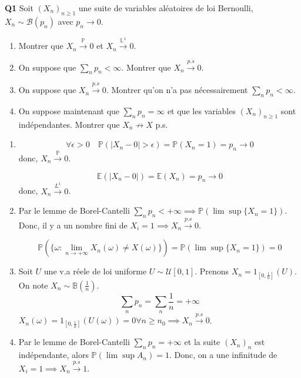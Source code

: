 \documentclass[french]{article}
\begin{document}
\begin{tcolorbox}[colback=gray!5!white,colframe=gray!75!black]
	\textbf{\large{Q1}} Soit $(X_n)_{n \geq 1}$ une suite de variables aléatoires de loi Bernoulli, $X_n \sim \mathcal{B}(p_n)$ avec $p_n \to 0$. 
	\begin{enumerate}
		\item Montrer que $X_n \xrightarrow{\mathbb{P}} 0$ et $X_n \xrightarrow{\mathbb{L}^1} 0$.
		\item On suppose que $\sum_{n} p_n < \infty$. Montrer que $X_n \xrightarrow{p.s} 0$.
		\item On suppose que $X_n \xrightarrow{p.s} 0$. Montrer qu'on n'a pas nécessairement $\sum_{n}p_n < \infty$.
		\item On suppose maintenant que $\sum_{n}p_n = \infty$ et que les variables $(X_n)_{n \geq 1}$ sont indépendantes. Montrer que $X_n \not\to X$ p.s.
	\end{enumerate}
\end{tcolorbox}

\begin{enumerate}
	
\item
\[\forall \epsilon>0 \quad \mathbb{P}(|X_n - 0| > \epsilon) = \mathbb{P}(X_n = 1) = p_n \to 0\]
donc, $X_n \xrightarrow{\mathbb{P}} 0$.

\[\mathbb{E}(|X_n - 0|) = \mathbb{E}(X_n) = p_n \to 0\]
donc, $X_n \xrightarrow{L^1} 0$.

\item
Par le lemme de Borel-Cantelli $\sum_n p_n < +\infty \implies \mathbb{P}(\lim \sup \{X_n = 1\})$. Donc, il y a un nombre fini de $X_i = 1 \implies X_n \xrightarrow{p.s} 0$.

\[\mathbb{P}\left(\{\omega : \lim_{n \to +\infty} X_n(\omega) \neq X(\omega)\}\right) = \mathbb{P}(\lim \sup \{X_n = 1\}) = 0\]

\item
Soit $U$ une v.a réele de loi uniforme $U \sim \mathcal{U}[0,1]$.
Prenons $X_n = \mathfrak{1}_{[0, \frac{1}{n}]}(U)$. On note $X_n \sim \mathbb{B}(\frac{1}{n})$.
\[\sum_{n} p_n = \sum_n \frac{1}{n} = +\infty\]
$X_n(\omega) = \mathfrak{1}_{[0, \frac{1}{n}]}(U(\omega)) = 0 \forall n \geq n_0 \implies X_n \xrightarrow{p.s} 0$.

\item
Par le lemme de Borel-Cantelli $\sum_{n} p_n = +\infty$ et la suite $(X_n)_n$ est indépendante, alors $\mathbb{P}(\lim \sup A_n) = 1$. Donc, on a une infinitude de $X_i =1 \implies X_n \xrightarrow{p.s} 1$.

\end{enumerate}
\end{document}
